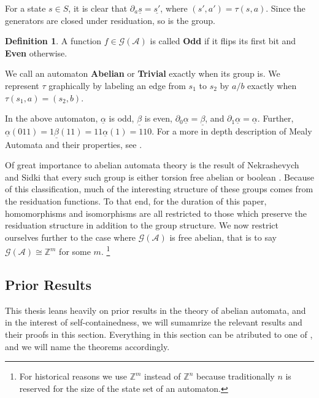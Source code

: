 \documentclass{article}
\newcommand{\A}{\mathcal{A}}
\newcommand{\G}{\mathcal{G}}
\newcommand{\Z}{\mathbb{Z}}
\newcommand{\2}{\textbf{2}}
\newcommand{\del}{\partial}
\theoremstyle{definition}
\newtheorem{defn}{Definition}
\begin{document}
For a state $s \in S$, it is clear that 
$\del_a \underline{s} = \underline{s'}$, where $(s',a') = \tau(s,a)$.
Since the generators are closed under residuation, so is the group.

\begin{defn}
  A function $f \in \G(\A)$ is called \textbf{Odd} if it flips its 
  first bit and \textbf{Even} otherwise.
\end{defn}

We call an automaton \textbf{Abelian} or \textbf{Trivial}
exactly when its group is. We represent $\tau$ graphically by labeling an
edge from $s_1$ to $s_2$ by $a/b$ exactly when $\tau(s_1,a) = (s_2,b)$.

In the above automaton, $\underline{\alpha}$ is odd, $\underline{\beta}$ 
is even, $\del_0 \underline{\alpha} = \underline{\beta}$, 
and $\del_1 \underline{\alpha} = \underline{\alpha}$.
Further,
$\underline{\alpha}(011) = 1\underline{\beta}(11) = 11\underline{\alpha}(1) = 110$.
For a more in depth description of Mealy Automata and their properties, 
see \cite{Sakarovitch09:automata_theory,Holcombe}.

Of great importance to abelian automata theory is the result of 
Nekrashevych and Sidki that every such group is either torsion free abelian or 
boolean \cite{NekrashevychSidki04:automorphisms}. Because of this classification, 
much of the interesting structure of these groups comes from the residuation
functions. To that end, for the duration of this paper, 
homomorphisms and isomorphisms are all restricted to those 
which preserve the residuation structure in addition to the group structure.
We now restrict ourselves further to the case where $\G(\A)$ is 
free abelian, that is to say $\G(\A) \cong \Z^m$ for some $m$.
\footnote%
{%
  For historical reasons we use $\Z^m$ instead of $\Z^n$ because 
  traditionally $n$ is reserved for the size of the state set of 
  an automaton.
}

\subsection{Prior Results}
This thesis leans heavily on prior results in the theory of abelian automata,
and in the interest of self-containedness, we will sumamrize the relevant
results and their proofs in this section. Everything in this section can be
atributed to one of \cite{NekrashevychSidki04:automorphisms, Sutner18:abelian_automata, Okano15:thesis}, 
and we will name the theorems accordingly.
\end{document}
